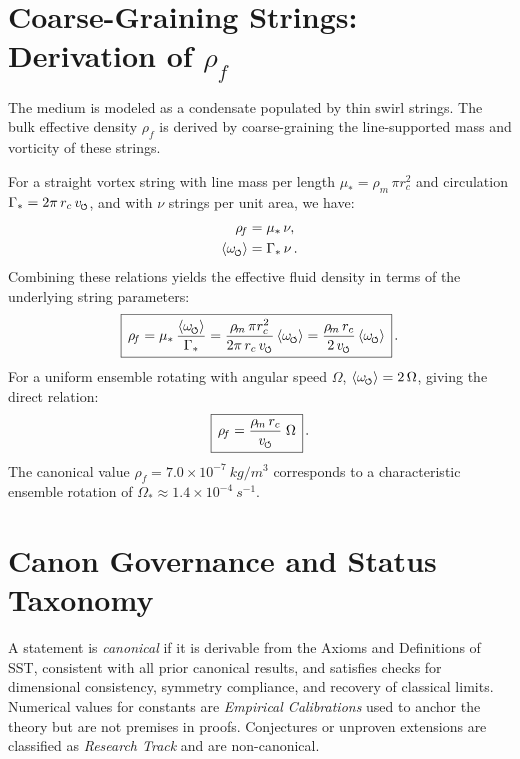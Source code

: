 \documentclass[11pt]{article}
\newcommand{\swirlarrow}{%
    \mathchoice{\mkern-2mu\scriptstyle\boldsymbol{\circlearrowleft}}%
    {\mkern-2mu\scriptstyle\boldsymbol{\circlearrowleft}}%
    {\mkern-2mu\scriptscriptstyle\boldsymbol{\circlearrowleft}}%
    {\mkern-2mu\scriptscriptstyle\boldsymbol{\circlearrowleft}}%
}
\newcommand{\vscore}{v_{\swirlarrow}}                    %
\newcommand{\rhof}{\rho_{\!f}}                           %
\newcommand{\rhom}{\rho_{\!m}}                           %
\newcommand{\rc}{r_c}                                    %
\begin{document}
\section{Coarse-Graining Strings: Derivation of $\rhof$}
\label{sec:canon_rhof_from_strings}
The medium is modeled as a condensate populated by thin swirl strings. The bulk effective density $\rhof$ is derived by coarse-graining the line-supported mass and vorticity of these strings.

For a straight vortex string with line mass per length $\mu_* = \rhom\,\pi \rc^2$ and circulation $\Gamma_* = 2\pi\,\rc\,\vscore$, and with $\nu$ strings per unit area, we have:
\begin{align}
\rhof &= \mu_*\,\nu, \\
\langle \omega_{\swirlarrow}\rangle &= \Gamma_*\,\nu\,.
\end{align}
Combining these relations yields the effective fluid density in terms of the underlying string parameters:
\begin{equation}
\boxed{\,\rhof = \mu_*\,\frac{\langle\omega_{\swirlarrow}\rangle}{\Gamma_*}
    = \frac{\rhom\,\pi \rc^2}{2\pi\,\rc\,\vscore}\,\langle\omega_{\swirlarrow}\rangle
    = \frac{\rhom\,\rc}{2\,\vscore}\,\langle\omega_{\swirlarrow}\rangle\,}\,.
\label{eq:rhof_from_omega}
\end{equation}
For a uniform ensemble rotating with angular speed $\Omega$, $\langle\omega_{\swirlarrow}\rangle = 2\,\Omega$, giving the direct relation:
\begin{equation}
\boxed{\,\rhof = \frac{\rhom\,\rc}{\vscore}\;\Omega\,}\,.
\label{eq:rhof_from_Omega}
\end{equation}
The canonical value $\rhof = 7.0\times 10^{-7}\ \si{kg/m^3}$ corresponds to a characteristic ensemble rotation of $\Omega_* \approx 1.4\times 10^{-4}\ \si{s^{-1}}$.

\section{Canon Governance and Status Taxonomy}
\label{sec:canon_governance}
A statement is \emph{canonical} if it is derivable from the Axioms and Definitions of SST, consistent with all prior canonical results, and satisfies checks for dimensional consistency, symmetry compliance, and recovery of classical limits. Numerical values for constants are \emph{Empirical Calibrations} used to anchor the theory but are not premises in proofs. Conjectures or unproven extensions are classified as \emph{Research Track} and are non-canonical.
\end{document}
